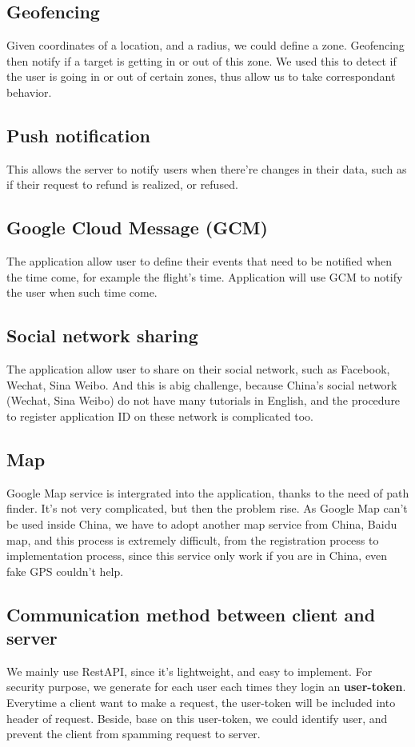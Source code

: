 \subsection{Geofencing}
Given coordinates of a location, and a radius, we could define a zone. Geofencing then notify if a target is getting in or out of this zone. We used this to detect if the user is going in or out of certain zones, thus allow us to take correspondant behavior.

\subsection{Push notification}
This allows the server to notify users when there're changes in their data, such as if their request to refund is realized, or refused. 

\subsection{Google Cloud Message (GCM)}
The application allow user to define their events that need to be notified when the time come, for example the flight's time. Application will use GCM to notify the user when such time come.

\subsection{Social network sharing}
The application allow user to share on their social network, such as Facebook, Wechat, Sina Weibo. And this is abig challenge, because China's social network (Wechat, Sina Weibo) do not have many tutorials in English, and the procedure to register application ID on these network is complicated too. 

\subsection{Map}
Google Map service is intergrated into the application, thanks to the need of path finder. It's not very complicated, but then the problem rise. As Google Map can't be used inside China, we have to adopt another map service from China, Baidu map, and this process is extremely difficult, from the registration process to implementation process, since this service only work if you are in China, even fake GPS couldn't help.

\subsection{Communication method between client and server}
We mainly use RestAPI, since it's lightweight, and easy to implement. For security purpose, we generate for each user each times they login an \textbf{user-token}. Everytime a client want to make a request, the user-token will be included into header of request. Beside, base on this user-token, we could identify user, and prevent the client from spamming request to server.

